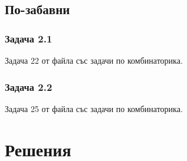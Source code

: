 \documentclass[12pt]{article}
\begin{document}
\subsection*{По-забавни}
\subsubsection*{Задача 2.1}
Задача 22 от файла със задачи по комбинаторика.
\subsubsection*{Задача 2.2}
Задача 25 от файла със задачи по комбинаторика.

\section*{Решения}
\end{document}
